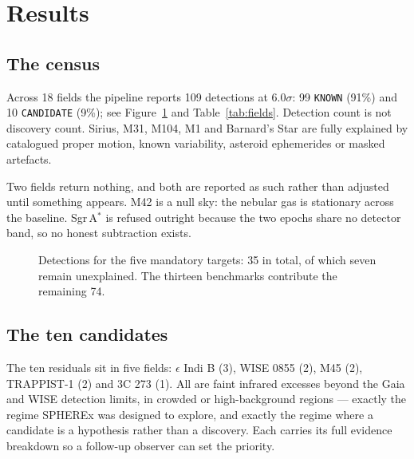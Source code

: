\documentclass[11pt,a4paper]{article}
\newcommand{\code}[1]{\texttt{\small #1}}
\begin{document}
{\section{Results}
\label{sec:results}

\subsection{The census}
Across 18 fields the pipeline reports 109 detections at $6.0\sigma$: 99 \code{KNOWN} (91\%) and 10
\code{CANDIDATE} (9\%); see Figure~\ref{fig:census} and Table~\ref{tab:fields}. Detection count is
not discovery count. Sirius, M31, M104, M1 and Barnard's Star are fully explained by catalogued
proper motion, known variability, asteroid ephemerides or masked artefacts.

Two fields return nothing, and both are reported as such rather than adjusted until something
appears. M42 is a null sky: the nebular gas is stationary across the baseline. Sgr\,A$^*$ is refused
outright because the two epochs share no detector band, so no honest subtraction exists.

\begin{figure}[t]
\centering
{}
\caption{Detections for the five mandatory targets: 35 in total, of which seven remain unexplained.
The thirteen benchmarks contribute the remaining 74.}
\label{fig:census}
\end{figure}

\subsection{The ten candidates}
The ten residuals sit in five fields: $\epsilon$ Indi B (3), WISE 0855 (2), M45 (2), TRAPPIST-1 (2)
and 3C 273 (1). All are faint infrared excesses beyond the Gaia and WISE detection limits, in crowded
or high-background regions --- exactly the regime SPHEREx was designed to explore, and exactly the
regime where a candidate is a hypothesis rather than a discovery. Each carries its full evidence
breakdown so a follow-up observer can set the priority.

}
\end{document}
